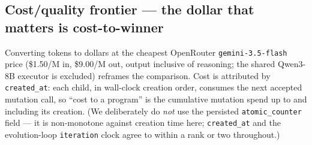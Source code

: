\documentclass[11pt]{article}
\begin{document}
\subsection{Cost/quality frontier --- the dollar that matters is cost-to-winner}
\label{sec:pareto}
Converting tokens to dollars at the cheapest OpenRouter \texttt{gemini-3.5-flash} price
(\$1.50/M in, \$9.00/M out, output inclusive of reasoning; the shared Qwen3-8B executor is
excluded) reframes the comparison. Cost is attributed by \texttt{created\_at}: each child, in
wall-clock creation order, consumes the next accepted mutation call, so ``cost to a program'' is
the cumulative mutation spend up to and including its creation. (We deliberately do \emph{not}
use the persisted \texttt{atomic\_counter} field --- it is non-monotone against creation time
here; \texttt{created\_at} and the evolution-loop \texttt{iteration} clock agree to within a
rank or two throughout.)
\end{document}
